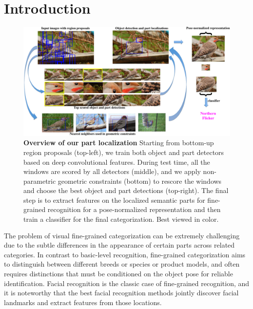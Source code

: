 \section{Introduction}

\begin{figure}[h]
\begin{center}
   \includegraphics[width=0.99\linewidth]{concept.pdf}
\end{center}
   \caption{\textbf{Overview of our part localization}  Starting from bottom-up region proposals (top-left), we train both object and part detectors based on deep convolutional features. During test time, all the windows are scored by all detectors (middle), and we apply non-parametric geometric constraints (bottom) to rescore the windows and choose the best object and part detections (top-right).  The final step is to extract features on the localized semantic parts for fine-grained recognition for a pose-normalized representation and then train a classifier for the final categorization. Best viewed in color.} 
\label{fig:concept}
\end{figure}

   
The problem of visual fine-grained categorization can be extremely challenging due to the subtle differences in the appearance of certain parts across related categories. In contrast to basic-level recognition, fine-grained categorization aims to distinguish between different breeds or species or product models, and often requires distinctions that must be conditioned on the object pose for reliable identification. Facial recognition is the classic case of fine-grained recognition, and it is noteworthy that the best facial recognition methods jointly discover facial landmarks and extract features from those locations. 


